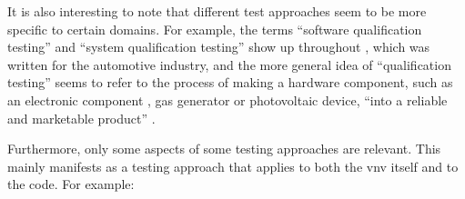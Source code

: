    It is also interesting to note that different test approaches seem to be more
    specific to certain domains. For example, the terms ``software qualification
    testing'' and ``system qualification testing'' show up throughout
    \citep{SPICE2022}, which was written for the automotive industry, and the more
    general idea of ``qualification testing'' seems to refer to the process of
    making a hardware component, such as an electronic component
    \citep{AhsanEtAl2020}, gas generator \citep{ParateEtAl2021} or photovoltaic
    device, ``into a reliable and marketable product'' \citep[p.~1]{SuhirEtAl2013}.
\fi

Furthermore, only some aspects of some testing approaches are relevant. This
mainly manifests as a testing approach that applies to both the \acs{vnv} itself
and to the code. For example:

